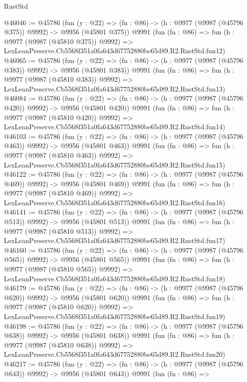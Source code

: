 \begin{lexlean}{RustStd}
\begin{coremodule}
@46046 := @45786
    (fun (y : @22) => (fn : @86) -> (h : @9977 (@9987 (@45796 @375)) @9992) -> @9956 (@45801 @375))
    @9991
    (fun (fn : @86) =>
    fun (h : @9977 (@9987 (@45810 @375)) @9992) =>
    LexLeanPreserve.Cb5568f351a0fa643d67752880be65d89.R2.RustStd.fun12)
@46065 := @45786
    (fun (y : @22) => (fn : @86) -> (h : @9977 (@9987 (@45796 @383)) @9992) -> @9956 (@45801 @383))
    @9991
    (fun (fn : @86) =>
    fun (h : @9977 (@9987 (@45810 @383)) @9992) =>
    LexLeanPreserve.Cb5568f351a0fa643d67752880be65d89.R2.RustStd.fun13)
@46084 := @45786
    (fun (y : @22) => (fn : @86) -> (h : @9977 (@9987 (@45796 @420)) @9992) -> @9956 (@45801 @420))
    @9991
    (fun (fn : @86) =>
    fun (h : @9977 (@9987 (@45810 @420)) @9992) =>
    LexLeanPreserve.Cb5568f351a0fa643d67752880be65d89.R2.RustStd.fun14)
@46103 := @45786
    (fun (y : @22) => (fn : @86) -> (h : @9977 (@9987 (@45796 @463)) @9992) -> @9956 (@45801 @463))
    @9991
    (fun (fn : @86) =>
    fun (h : @9977 (@9987 (@45810 @463)) @9992) =>
    LexLeanPreserve.Cb5568f351a0fa643d67752880be65d89.R2.RustStd.fun15)
@46122 := @45786
    (fun (y : @22) => (fn : @86) -> (h : @9977 (@9987 (@45796 @469)) @9992) -> @9956 (@45801 @469))
    @9991
    (fun (fn : @86) =>
    fun (h : @9977 (@9987 (@45810 @469)) @9992) =>
    LexLeanPreserve.Cb5568f351a0fa643d67752880be65d89.R2.RustStd.fun16)
@46141 := @45786
    (fun (y : @22) => (fn : @86) -> (h : @9977 (@9987 (@45796 @513)) @9992) -> @9956 (@45801 @513))
    @9991
    (fun (fn : @86) =>
    fun (h : @9977 (@9987 (@45810 @513)) @9992) =>
    LexLeanPreserve.Cb5568f351a0fa643d67752880be65d89.R2.RustStd.fun17)
@46160 := @45786
    (fun (y : @22) => (fn : @86) -> (h : @9977 (@9987 (@45796 @565)) @9992) -> @9956 (@45801 @565))
    @9991
    (fun (fn : @86) =>
    fun (h : @9977 (@9987 (@45810 @565)) @9992) =>
    LexLeanPreserve.Cb5568f351a0fa643d67752880be65d89.R2.RustStd.fun18)
@46179 := @45786
    (fun (y : @22) => (fn : @86) -> (h : @9977 (@9987 (@45796 @620)) @9992) -> @9956 (@45801 @620))
    @9991
    (fun (fn : @86) =>
    fun (h : @9977 (@9987 (@45810 @620)) @9992) =>
    LexLeanPreserve.Cb5568f351a0fa643d67752880be65d89.R2.RustStd.fun19)
@46198 := @45786
    (fun (y : @22) => (fn : @86) -> (h : @9977 (@9987 (@45796 @638)) @9992) -> @9956 (@45801 @638))
    @9991
    (fun (fn : @86) =>
    fun (h : @9977 (@9987 (@45810 @638)) @9992) =>
    LexLeanPreserve.Cb5568f351a0fa643d67752880be65d89.R2.RustStd.fun20)
@46217 := @45786
    (fun (y : @22) => (fn : @86) -> (h : @9977 (@9987 (@45796 @643)) @9992) -> @9956 (@45801 @643))
    @9991
    (fun (fn : @86) =>

\end{coremodule}
\end{lexlean}
